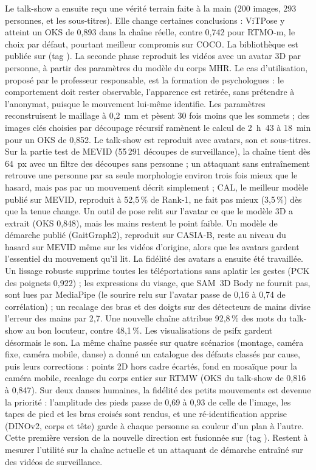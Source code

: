 \documentclass[11pt,a4paper]{report}
\newcommand{\code}[1]{\texttt{\detokenize{#1}}}
\begin{document}
Le talk-show a ensuite reçu une vérité terrain faite à la main (200 images, 293 personnes, et les sous-titres). Elle change certaines
conclusions : ViTPose y atteint un OKS de 0,893 dans la chaîne réelle, contre 0,742 pour RTMO-m, le choix par défaut, pourtant
meilleur compromis sur COCO. La bibliothèque est publiée sur \code{main} (tag \code{tm-v1-optimisations}). La seconde phase reproduit les vidéos avec un avatar 3D par personne, à partir des paramètres du modèle du corps MHR. Le cas
d'utilisation, proposé par le professeur responsable, est la formation de psychologues : le comportement doit rester observable,
l'apparence est retirée, sans prétendre à l'anonymat, puisque le mouvement lui-même identifie. Les paramètres reconstruisent le
maillage à 0,2~mm et pèsent 30 fois moins que les sommets ; des images clés choisies par découpage récursif ramènent le calcul de
2~h~43 à 18~min pour un OKS de 0,852. Le talk-show est reproduit avec avatars, son et sous-titres. Sur la partie test de MEVID
(55\,291 découpes de surveillance), la chaîne tient dès 64~px avec un filtre des découpes sans personne ; un attaquant sans
entraînement retrouve une personne par sa seule morphologie environ trois fois mieux que le hasard, mais pas par un mouvement décrit
simplement ; CAL, le meilleur modèle publié sur MEVID, reproduit à 52,5\,\% de Rank-1, ne fait pas mieux (3,5\,\%) dès que la
tenue change. Un outil de pose relit sur l'avatar ce que le modèle 3D a extrait (OKS 0,848), mais les mains restent le point faible.
Un modèle de démarche publié (GaitGraph2), reproduit sur CASIA-B, reste au niveau du hasard sur MEVID même sur les vidéos
d'origine, alors que les avatars gardent l'essentiel du mouvement qu'il lit. La fidélité des avatars a ensuite été travaillée. Un
lissage robuste supprime toutes les téléportations sans aplatir les gestes (PCK des poignets 0,922) ; les expressions du visage,
que SAM~3D Body ne fournit pas, sont lues par MediaPipe (le sourire relu sur l'avatar passe de 0,16 à 0,74 de corrélation) ; un
recalage des bras et des doigts sur des détecteurs de mains divise l'erreur des mains par 2,7. Une nouvelle chaîne attribue 92,8\,\%
des mots du talk-show au bon locuteur, contre 48,1\,\%. Les visualisations de psifx gardent désormais le son. La même chaîne passée
sur quatre scénarios (montage, caméra fixe, caméra mobile, danse) a donné un catalogue des défauts classés par cause, puis leurs
corrections : points 2D hors cadre écartés, fond en mosaïque pour la caméra mobile, recalage du corps entier sur RTMW (OKS du talk-show
de 0,816 à 0,847). Sur deux danses humaines, la fidélité des petits mouvements est devenue la priorité : l'amplitude des pieds passe de
0,69 à 0,93 de celle de l'image, les tapes de pied et les bras croisés sont rendus, et une ré-identification apprise (DINOv2, corps et
tête) garde à chaque personne sa couleur d'un plan à l'autre. Cette première version de la nouvelle direction est fusionnée sur
\code{dev} (tag \code{tm-v2-avatars-dev}). Restent à mesurer l'utilité sur la chaîne actuelle et un attaquant de démarche entraîné sur
des vidéos de surveillance.
\end{document}

